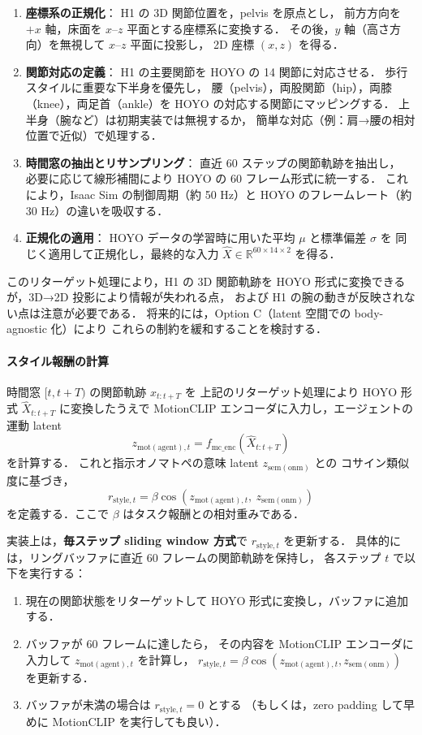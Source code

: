 \documentclass[a4paper,10pt]{jsarticle}
\begin{document}
\begin{enumerate}
  \item \textbf{座標系の正規化}：
    H1 の 3D 関節位置を，pelvis を原点とし，
    前方方向を $+x$ 軸，床面を $x$--$z$ 平面とする座標系に変換する．
    その後，$y$ 軸（高さ方向）を無視して $x$--$z$ 平面に投影し，
    2D 座標 $(x, z)$ を得る．
  \item \textbf{関節対応の定義}：
    H1 の主要関節を HOYO の 14 関節に対応させる．
    歩行スタイルに重要な下半身を優先し，
    腰（pelvis），両股関節（hip），両膝（knee），両足首（ankle）を
    HOYO の対応する関節にマッピングする．
    上半身（腕など）は初期実装では無視するか，
    簡単な対応（例：肩→腰の相対位置で近似）で処理する．
  \item \textbf{時間窓の抽出とリサンプリング}：
    直近 60 ステップの関節軌跡を抽出し，
    必要に応じて線形補間により HOYO の 60 フレーム形式に統一する．
    これにより，Isaac Sim の制御周期（約 50 Hz）と
    HOYO のフレームレート（約 30 Hz）の違いを吸収する．
  \item \textbf{正規化の適用}：
    HOYO データの学習時に用いた平均 $\mu$ と標準偏差 $\sigma$ を
    同じく適用して正規化し，最終的な入力
    $\hat{X} \in \mathbb{R}^{60 \times 14 \times 2}$ を得る．
\end{enumerate}

このリターゲット処理により，H1 の 3D 関節軌跡を
HOYO 形式に変換できるが，3D→2D 投影により情報が失われる点，
および H1 の腕の動きが反映されない点は注意が必要である．
将来的には，Option C（latent 空間での body-agnostic 化）により
これらの制約を緩和することを検討する．

\paragraph{スタイル報酬の計算}
時間窓 $[t, t+T)$ の関節軌跡 $x_{t:t+T}$ を
上記のリターゲット処理により HOYO 形式 $\hat{X}_{t:t+T}$ に変換したうえで
MotionCLIP エンコーダに入力し，エージェントの運動 latent
\[
  z_{\mathrm{mot(agent)}, t}
  = f_{\mathrm{mc\_enc}}(\hat{X}_{t:t+T})
\]
を計算する．
これと指示オノマトペの意味 latent $z_{\mathrm{sem(onm)}}$ との
コサイン類似度に基づき，
\[
  r_{\mathrm{style}, t}
  = \beta
    \cos\left(
      z_{\mathrm{mot(agent)}, t},\ 
      z_{\mathrm{sem(onm)}}
    \right)
\]
を定義する．ここで $\beta$ はタスク報酬との相対重みである．

実装上は，\textbf{毎ステップ sliding window 方式}で $r_{\mathrm{style}, t}$ を更新する．
具体的には，リングバッファに直近 60 フレームの関節軌跡を保持し，
各ステップ $t$ で以下を実行する：
\begin{enumerate}
  \item 現在の関節状態をリターゲットして HOYO 形式に変換し，バッファに追加する．
  \item バッファが 60 フレームに達したら，
        その内容を MotionCLIP エンコーダに入力して
        $z_{\mathrm{mot(agent)}, t}$ を計算し，
        $r_{\mathrm{style}, t} = \beta \cos(z_{\mathrm{mot(agent)}, t}, z_{\mathrm{sem(onm)}})$ を更新する．
  \item バッファが未満の場合は $r_{\mathrm{style}, t} = 0$ とする
        （もしくは，zero padding して早めに MotionCLIP を実行しても良い）．
\end{enumerate}
\end{document}

